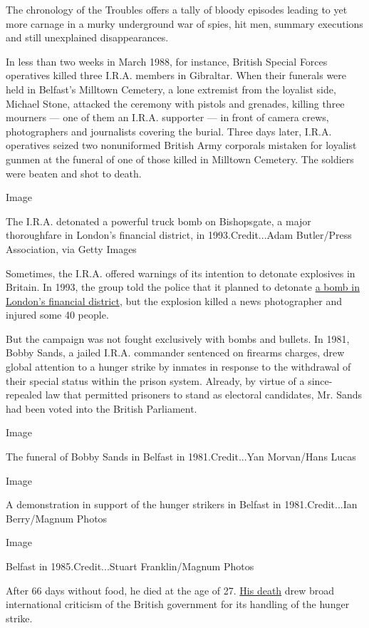 The chronology of the Troubles offers a tally of bloody episodes leading
to yet more carnage in a murky underground war of spies, hit men,
summary executions and still unexplained disappearances.

In less than two weeks in March 1988, for instance, British Special
Forces operatives killed three I.R.A. members in Gibraltar. When their
funerals were held in Belfast's Milltown Cemetery, a lone extremist from
the loyalist side, Michael Stone, attacked the ceremony with pistols and
grenades, killing three mourners --- one of them an I.R.A. supporter ---
in front of camera crews, photographers and journalists covering the
burial. Three days later, I.R.A. operatives seized two nonuniformed
British Army corporals mistaken for loyalist gunmen at the funeral of
one of those killed in Milltown Cemetery. The soldiers were beaten and
shot to death.

Image

The I.R.A. detonated a powerful truck bomb on Bishopsgate, a major
thoroughfare in London's financial district, in 1993.Credit...Adam
Butler/Press Association, via Getty Images

Sometimes, the I.R.A. offered warnings of its intention to detonate
explosives in Britain. In 1993, the group told the police that it
planned to detonate
\href{https://www.nytimes.com/1993/04/25/world/1-dead-40-hurt-as-a-blast-rips-central-london.html}{a
bomb in London's financial district}, but the explosion killed a news
photographer and injured some 40 people.

But the campaign was not fought exclusively with bombs and bullets. In
1981, Bobby Sands, a jailed I.R.A. commander sentenced on firearms
charges, drew global attention to a hunger strike by inmates in response
to the withdrawal of their special status within the prison system.
Already, by virtue of a since-repealed law that permitted prisoners to
stand as electoral candidates, Mr. Sands had been voted into the British
Parliament.

Image

The funeral of Bobby Sands in Belfast in 1981.Credit...Yan Morvan/Hans
Lucas

Image

A demonstration in support of the hunger strikers in Belfast in
1981.Credit...Ian Berry/Magnum Photos

Image

Belfast in 1985.Credit...Stuart Franklin/Magnum Photos

After 66 days without food, he died at the age of 27.
\href{https://www.nytimes.com/1981/05/05/world/sands-dies-in-northern-ireland-jail-on-the-66th-day-of-hunger-strike.html}{His
death} drew broad international criticism of the British government for
its handling of the hunger strike.

